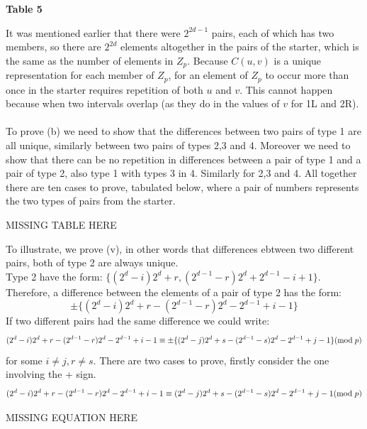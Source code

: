 \documentclass[
  12pt,
  a4paper]{book}
\begin{document}
\textbf{Table 5}

It was mentioned earlier that there were \(2^{2d-1}\) pairs, each of
which has two members, so there are \(2^{2d}\) elements altogether in
the pairs of the starter, which is the same as the number of elements in
\(Z_p\). Because \(C(u,v)\) is a unique representation for each member
of \(Z_p\), for an element of \(Z_p\) to occur more than once in the
starter requires repetition of both \(u\) and \(v\). This cannot happen
because when two intervals overlap (as they do in the values of \(v\)
for 1L and 2R).\\
~\\
To prove (b) we need to show that the differences between two pairs of
type 1 are all unique, similarly between two pairs of types 2,3 and 4.
Moreover we need to show that there can be no repetition in differences
between a pair of type 1 and a pair of type 2, also type 1 with types 3
in 4. Similarly for 2,3 and 4. All together there are ten cases to
prove, tabulated below, where a pair of numbers represents the two types
of pairs from the starter.

MISSING TABLE HERE

To illustrate, we prove (v), in other words that differences ebtween two
different pairs, both of type 2 are always unique.\\
Type 2 have the form: \(\{(2^d-i)2^d+r, (2^{d-1}-r)2^d+2^{d-1}-i+1\}\).
Therefore, a difference between the elements of a pair of type 2 has the
form: \[\pm \{(2^d-i)2^d+r-(2^{d-1}-r)2^d-2^{d-1}+i-1\}\] If two
different pairs had the same difference we could write:
\[(2^d-i)2^d+r-(2^{d-1}-r)2^d-2^{d-1}+i-1
\equiv \pm \{(2^d-j)2^d +s-(2^{d-1}-s)2^d-2^{d-1}+j-1\}(\mathrm{mod} \hspace{0.1cm} p)\]
for some \(i \neq j, r \neq s\). There are two cases to prove, firstly
consider the one involving the + sign.
\[(2^d-i)2^d+r-(2^{d-1}-r)2^d-2^{d-1}+i-1 \equiv (2^d-j)2^d + s -(2^{d-1}-s)2^d - 2^{d-1} + j -1 (\mathrm{mod} \hspace{0.1cm} p)\]

MISSING EQUATION HERE
\end{document}
